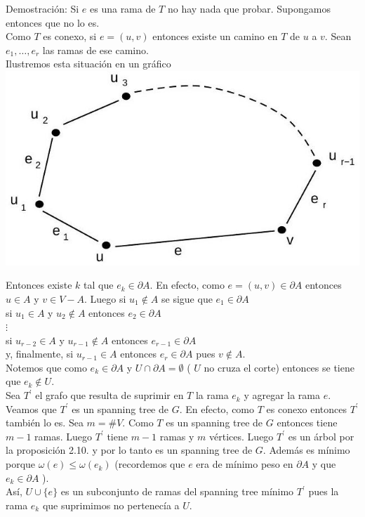 \documentclass[10pt]{article}
\begin{document}
Demostración: Si $e$ es una rama de $T$ no hay nada que probar. Supongamos entonces que no lo es.\\
Como $T$ es conexo, si $e=(u, v)$ entonces existe un camino en $T$ de $u$ a $v$. Sean $e_{1}, \ldots, e_{r}$ las ramas de ese camino.\\
Ilustremos esta situación en un gráfico\\
\includegraphics[max width=\textwidth, center]{2025_09_05_93c7c1835f249f70c0eeg-17}

Entonces existe $k$ tal que $e_{k} \in \partial A$. En efecto, como $e=(u, v) \in \partial A$ entonces $u \in A$ y $v \in V-A$. Luego si $u_{1} \notin A$ se sigue que $e_{1} \in \partial A$\\
si $u_{1} \in A$ y $u_{2} \notin A$ entonces $e_{2} \in \partial A$\\
$\vdots$\\
si $u_{r-2} \in A$ y $u_{r-1} \notin A$ entonces $e_{r-1} \in \partial A$\\
y, finalmente, si $u_{r-1} \in A$ entonces $e_{r} \in \partial A$ pues $v \notin A$.\\
Notemos que como $e_{k} \in \partial A$ y $U \cap \partial A=\emptyset$ ( $U$ no cruza el corte) entonces se tiene que $e_{k} \notin U$.\\
Sea $T^{\prime}$ el grafo que resulta de suprimir en $T$ la rama $e_{k}$ y agregar la rama $e$. Veamos que $T^{\prime}$ es un spanning tree de $G$. En efecto, como $T$ es conexo entonces $T^{\prime}$ también lo es. Sea $m=\# V$. Como $T$ es un spanning tree de $G$ entonces tiene $m-1$ ramas. Luego $T^{\prime}$ tiene $m-1$ ramas y $m$ vértices. Luego $T^{\prime}$ es un árbol por la proposición 2.10. y por lo tanto es un spanning tree de $G$. Además es mínimo porque $\omega(e) \leq \omega\left(e_{k}\right)$ (recordemos que $e$ era de mínimo peso en $\partial A$ y que $e_{k} \in \partial A$ ).\\
Así, $U \cup\{e\}$ es un subconjunto de ramas del spanning tree mínimo $T^{\prime}$ pues la rama $e_{k}$ que suprimimos no pertenecía a $U$.
\end{document}
